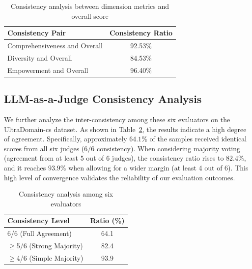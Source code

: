 \documentclass[11pt]{article}
\begin{document}
\begin{table}[h]
\centering
\small
\begin{tabular}{lc}
\toprule
\textbf{Consistency Pair} & \textbf{Consistency Ratio} \\
\midrule
Comprehensiveness and Overall & 92.53\% \\
Diversity and Overall & 84.53\% \\
Empowerment and Overall & 96.40\% \\
\bottomrule
\end{tabular}
\caption{Consistency analysis between dimension metrics and overall score}
\label{tab:consistency_results}
\end{table}



\subsection{LLM-as-a-Judge Consistency Analysis}
\label{subsec:judge_consistency}

We further analyze the inter-consistency among these six evaluators on the UltraDomain-cs dataset. As shown in Table~\ref{tab:judge_consistency}, the results indicate a high degree of agreement. Specifically, approximately $64.1\%$ of the samples received identical scores from all six judges (6/6 consistency). When considering majority voting (agreement from at least 5 out of 6 judges), the consistency ratio rises to $82.4\%$, and it reaches $93.9\%$ when allowing for a wider margin (at least 4 out of 6). This high level of convergence validates the reliability of our evaluation outcomes.

\begin{table}[h]
\centering
\begin{tabular}{lc}
\toprule
\textbf{Consistency Level} & \textbf{Ratio (\%)} \\
\midrule
6/6 (Full Agreement) & 64.1 \\
$\geq$5/6 (Strong Majority) & 82.4 \\
$\geq$4/6 (Simple Majority) & 93.9 \\\bottomrule
\end{tabular}
\caption{Consistency analysis among six evaluators}
\label{tab:judge_consistency}
\end{table}
\end{document}
